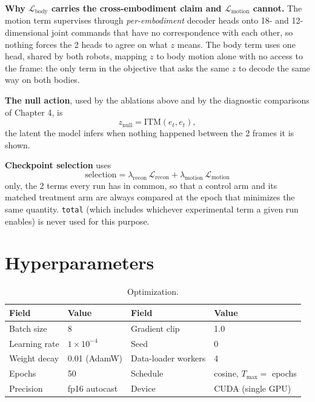\documentclass[12pt,a4paper,oneside]{report}
\begin{document}
\noindent\textbf{Why $\mathcal{L}_{\text{body}}$ carries the cross-embodiment claim and
$\mathcal{L}_{\text{motion}}$ cannot.} The motion term supervises through \emph{per-embodiment}
decoder heads onto 18- and 12-dimensional joint commands that have no correspondence with each other,
so nothing forces the 2 heads to agree on what $z$ means. The body term uses one head, shared by
both robots, mapping $z$ to body motion alone with no access to the frame: the only term in the
objective that asks the same $z$ to decode the same way on both bodies.

\noindent\textbf{The null action}, used by the ablations above and by the diagnostic comparisons of Chapter 4, is
\[
z_{\text{null}} = \mathrm{ITM}(e_t, e_t),
\]
the latent the model infers when nothing happened between the 2 frames it is shown.

\noindent\textbf{Checkpoint selection} uses
\[
\text{selection} = \lambda_{\text{recon}}\,\mathcal{L}_{\text{recon}} + \lambda_{\text{motion}}\,\mathcal{L}_{\text{motion}}
\]
only, the 2 terms every run has in common, so that a control arm and its matched treatment arm are always
compared at the epoch that minimizes the same quantity. \texttt{total} (which includes whichever experimental
term a given run enables) is never used for this purpose.

\section{Hyperparameters}

\begin{table}[H]
\centering
\footnotesize
\caption{Optimization.}
\label{tab:appendix-opt}
\begin{tabularx}{\textwidth}{YYYY}
\toprule
\textbf{Field} & \textbf{Value} & \textbf{Field} & \textbf{Value}\\
\midrule
Batch size & 8 & Gradient clip & 1.0\\
Learning rate & $1\times10^{-4}$ & Seed & 0\\
Weight decay & 0.01 (AdamW) & Data-loader workers & 4\\
Epochs & 50 & Schedule & cosine, $T_{\max} =$ epochs\\
Precision & fp16 autocast & Device & CUDA (single GPU)\\
\bottomrule
\end{tabularx}
\end{table}
\end{document}
